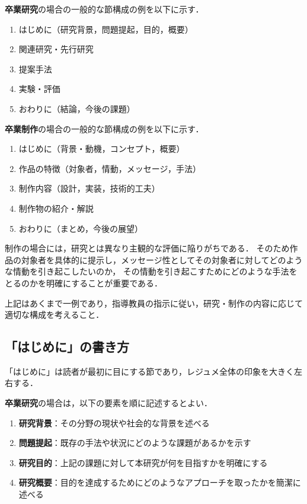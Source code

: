\textbf{卒業研究}の場合の一般的な節構成の例を以下に示す．
\begin{enumerate}
    \item はじめに（研究背景，問題提起，目的，概要）
    \item 関連研究・先行研究
    \item 提案手法
    \item 実験・評価
    \item おわりに（結論，今後の課題）
\end{enumerate}

\textbf{卒業制作}の場合の一般的な節構成の例を以下に示す．
\begin{enumerate}
    \item はじめに（背景・動機，コンセプト，概要）
    \item 作品の特徴（対象者，情動，メッセージ，手法）
    \item 制作内容（設計，実装，技術的工夫）
    \item 制作物の紹介・解説
    \item おわりに（まとめ，今後の展望）
\end{enumerate}
制作の場合には，研究とは異なり主観的な評価に陥りがちである．
そのため作品の対象者を具体的に提示し，メッセージ性としてその対象者に対してどのような情動を引き起こしたいのか，
その情動を引き起こすためにどのような手法をとるのかを明確にすることが重要である．

上記はあくまで一例であり，指導教員の指示に従い，研究・制作の内容に応じて適切な構成を考えること．

\subsection{「はじめに」の書き方}
\label{subsec:intro-writing}
「はじめに」は読者が最初に目にする節であり，レジュメ全体の印象を大きく左右する．

\textbf{卒業研究}の場合は，以下の要素を順に記述するとよい．
\begin{enumerate}
    \item \textbf{研究背景}：その分野の現状や社会的な背景を述べる
    \item \textbf{問題提起}：既存の手法や状況にどのような課題があるかを示す
    \item \textbf{研究目的}：上記の課題に対して本研究が何を目指すかを明確にする
    \item \textbf{研究概要}：目的を達成するためにどのようなアプローチを取ったかを簡潔に述べる
\end{enumerate}

